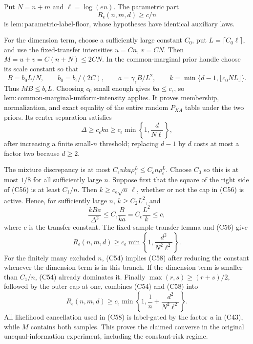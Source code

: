 Put \(N=n+m\) and \(\ell=\log(en)\).  The parametric part
\[
 R_\epsilon(n,m,d)\ge c/n                                           \tag{C54}
\]
is \(\mathrm{lem:parametric\mbox{-}label\mbox{-}floor}\), whose hypotheses have identical auxiliary laws.

For the dimension term, choose a sufficiently large constant \(C_0\), put \(L=\lceil C_0\ell\rceil\), and use the fixed-transfer intensities \(u=Cn\), \(v=CN\).  Then \(M=u+v=C(n+N)\le2CN\).  In the common-marginal prior handle choose its scale constant so that
\[
 B=b_0L/N,\qquad b_0=b_\epsilon/(2C),\qquad
 a=\gamma_\epsilon B/L^2,\qquad
 k=\min\{d-1,\lfloor c_0NL\rfloor\}.                              \tag{C55}
\]
Thus \(MB\le b_\epsilon L\).  Choosing \(c_0\) small enough gives \(ka\le c_\epsilon\), so \(\mathrm{lem:common\mbox{-}marginal\mbox{-}uniform\mbox{-}intensity}\) applies.  It proves membership, normalization, and exact equality of the entire random \(P_{XA}\) table under the two priors.  Its center separation satisfies
\[
 \Delta\ge c_\epsilon ka
 \ge c_\epsilon\min\!\left\{1,\frac d{N\ell}\right\},             \tag{C56}
\]
after increasing a finite small-\(n\) threshold; replacing \(d-1\) by \(d\) costs at most a factor two because \(d\ge2\).

The mixture discrepancy is at most \(C_\epsilon uka\rho_\epsilon^L\le C_\epsilon n\rho_\epsilon^L\).  Choose \(C_0\) so this is at most \(1/8\) for all sufficiently large \(n\).  Suppose first that the square of the right side of (C56) is at least \(C_1/n\).  Then \(k\ge c_\epsilon\sqrt n\,\ell\), whether or not the cap in (C56) is active.  Hence, for sufficiently large \(n\), \(k\ge C_2L^2\), and
\[
 \frac{kBa}{\Delta^2}\le C_\epsilon\frac{B}{ka}
 =C_\epsilon\frac{L^2}{k}\le c,                                  \tag{C57}
\]
where \(c\) is the transfer constant.  The fixed-sample transfer lemma and (C56) give
\[
 R_\epsilon(n,m,d)\ge c_\epsilon
 \min\!\left\{1,\frac{d^2}{N^2\ell^2}\right\}.                   \tag{C58}
\]
For the finitely many excluded \(n\), (C54) implies (C58) after reducing the constant whenever the dimension term is in this branch.  If the dimension term is smaller than \(C_1/n\), (C54) already dominates it.  Finally \(\max(r,s)\ge(r+s)/2\), followed by the outer cap at one, combines (C54) and (C58) into
\[
 R_\epsilon(n,m,d)\ge c_\epsilon
 \min\!\left\{1,\frac1n+\frac{d^2}{N^2\ell^2}\right\}.            \tag{C59}
\]
All likelihood cancellation used in (C58) is label-gated by the factor \(u\) in (C43), while \(M\) contains both samples.  This proves the claimed converse in the original unequal-information experiment, including the constant-risk regime.

